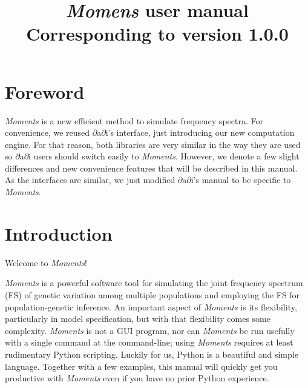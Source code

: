 \documentclass[12pt]{article}
\newcommand{\dadi}{$\partial$a$\partial$i\xspace}
\begin{document}
\title{\textit{Momens} user manual\\\normalsize  Corresponding to version 1.0.0}
\date{}
\maketitle

\tableofcontents

\clearpage

\renewcommand*{\lstlistlistingname}{Example code}
\lstlistoflistings

\clearpage
\setcounter{section}{-1}
\section{Foreword}
\textit{Moments} is a new efficient method to simulate frequency spectra. For convenience, we reused \dadi's interface, just introducing our new computation engine. For that reason, both libraries are very similar in the way they are used so \dadi users should switch easily to \textit{Moments}. However, we denote a few slight differences and new convenience features that will be described in this manual. As the interfaces are similar, we just modified \dadi's manual to be specific to \textit{Moments}.

\section{Introduction}

Welcome to \textit{Moments}!

\textit{Moments} is a powerful software tool for simulating the joint frequency spectrum (FS) of genetic variation among multiple populations and employing the FS for population-genetic inference.
An important aspect of \textit{Moments} is its flexibility, particularly in model specification, but with that flexibility comes some complexity.
\textit{Moments} is not a GUI program, nor can \textit{Moments} be run usefully with a single command at the command-line; using \textit{Moments} requires at least rudimentary Python scripting.
Luckily for us, Python is a beautiful and simple language.
Together with a few examples, this manual will quickly get you productive with \textit{Moments} even if you have no prior Python experience.

\end{document}
